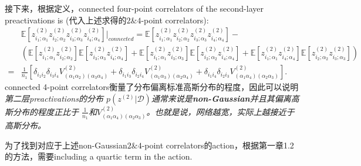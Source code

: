接下来，根据定义，connected four-point correlators of the second-layer preactivations is
(代入上述求得的$2\&4$-point correlators):
\begin{equation}
    \begin{aligned}
    & \mathbb{E}\left[z_{i_1;\alpha_1}^{(2)}z_{i_2;\alpha_2}^{(2)}
    z_{i_3;\alpha_3}^{(2)}z_{i_4;\alpha_4}^{(2)}\right]\bigg|_{connected} 
    = \mathbb{E}\left[z_{i_1;\alpha_1}^{(2)}z_{i_2;\alpha_2}^{(2)}
    z_{i_3;\alpha_3}^{(2)}z_{i_4;\alpha_4}^{(2)}\right] - \\
    & \left(
        \mathbb{E}\left[z_{i_1;\alpha_1}^{(2)}z_{i_2;\alpha_2}^{(2)}\right]
        \mathbb{E}\left[z_{i_3;\alpha_3}^{(2)}z_{i_4;\alpha_4}^{(2)}\right] +
        \mathbb{E}\left[z_{i_1;\alpha_1}^{(2)}z_{i_3;\alpha_3}^{(2)}\right]
        \mathbb{E}\left[z_{i_2;\alpha_2}^{(2)}z_{i_4;\alpha_4}^{(2)}\right] +
        \mathbb{E}\left[z_{i_1;\alpha_1}^{(2)}z_{i_4;\alpha_4}^{(2)}\right]
        \mathbb{E}\left[z_{i_2;\alpha_2}^{(2)}z_{i_3;\alpha_3}^{(2)}\right]
    \right) \\
    =& \frac{1}{n_1}\left[\delta_{i_1i_2}\delta_{i_3i_4}V_{(\alpha_1\alpha_2)(\alpha_3\alpha_4)}^{(2)}
     +\delta_{i_1i_3}\delta_{i_2i_4}V_{(\alpha_1\alpha_3)(\alpha_2\alpha_4)}^{(2)}
     +\delta_{i_1i_4}\delta_{i_2i_3}V_{(\alpha_1\alpha_4)(\alpha_2\alpha_3)}^{(2)}\right].
    \end{aligned}
\end{equation}
connected 4-point correlators衡量了分布偏离标准高斯分布的程度，因此可以说明\emph{第二层preactivations的分布
$p\left(z^{(2)}\bigg| \mathcal{D}\right)$通常来说是\textbf{non-Gaussian}并且其偏离高斯分布的程度正比于
$\frac{1}{n_1}$和$V_{(\alpha_1\alpha_4)(\alpha_2\alpha_3)}^{(2)}$。也就是说，网络越宽，实际上越接近于高斯分布。}

为了找到对应于上述non-Gaussian$2\&4$-point correlators的action，根据第一章1.2的方法，需要including a quartic 
term in the action. 

